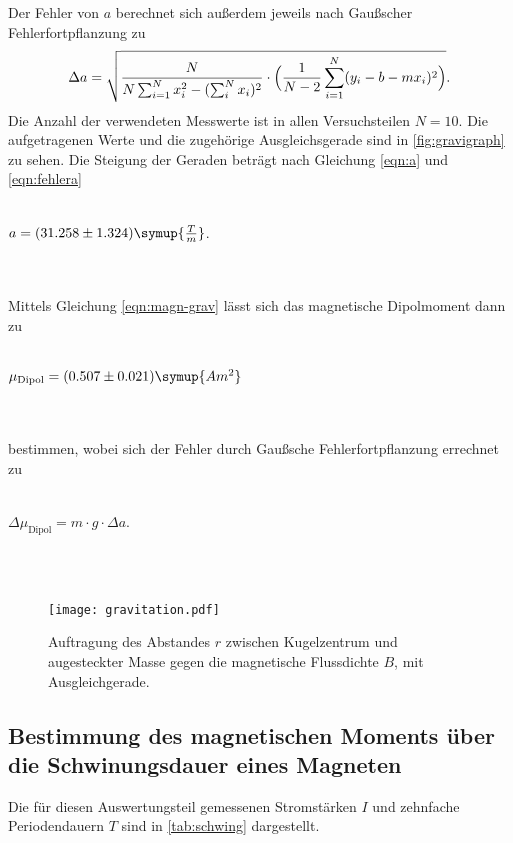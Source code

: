   Der Fehler von $a$ berechnet sich außerdem jeweils nach Gaußscher Fehlerfortpflanzung zu
  \begin{equation}
  \label{eqn:fehlera}
  \Delta a = \sqrt{\frac{N}{N \sum_{i = 1}^{N} x_i^{2} - (\sum_i^{N} x_i)^2} \cdot \Bigl (\frac {1}{N-2} \sum_{i = 1}^{N}(y_i -b - m x_i )^2 \Bigr) }.
  \end{equation}
  Die Anzahl der verwendeten Messwerte ist in allen Versuchsteilen $N = 10$.
  Die aufgetragenen Werte und die zugehörige Ausgleichsgerade sind in \autoref{fig:gravigraph} zu sehen.
  Die Steigung der Geraden beträgt nach Gleichung \eqref{eqn:a} und \eqref{eqn:fehlera}
  \\ \\
  \centerline{$a = (31.258 \pm 1.324) \symup{\frac{T}{m}}$.}
  \\ \\ 
  Mittels Gleichung \eqref{eqn:magn-grav} lässt sich das magnetische Dipolmoment dann zu
  \\ \\ 
  \centerline{$\mu_\text{Dipol} = (0.507 \pm 0.021) \symup{A m^2}$}
  \\ \\
  bestimmen, wobei sich der Fehler durch Gaußsche Fehlerfortpflanzung errechnet zu 
  \\ \\
  \centerline{$\Delta \mu_\text{Dipol} = m \cdot g \cdot \Delta a$.}
  \\ \\


\begin{figure}
  \centering
  \texttt{[image: gravitation.pdf]}
  \caption{Auftragung des Abstandes $r$ zwischen Kugelzentrum und augesteckter Masse gegen die magnetische Flussdichte $B$, mit Ausgleichgerade.}
  \label{fig:gravigraph}
\end{figure}

\subsection{Bestimmung des magnetischen Moments über die Schwinungsdauer eines Magneten}
    Die für diesen Auswertungsteil gemessenen Stromstärken $I$ und zehnfache Periodendauern $T$ sind in \autoref{tab:schwing} dargestellt.
    
   
